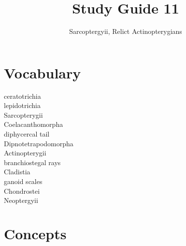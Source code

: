 \documentclass[letterpaper]{tufte-handout}
\title{Study Guide 11}
\author{Sarcoptergyii, Relict Actinopterygians}
\date{} %
\begin{document}
\maketitle	%


\section{Vocabulary}
\vspace{-1\baselineskip}
\begin{multicols}{2}
ceratotrichia \\
lepidotrichia \\
Sarcopterygii \\
Coelacanthomorpha \\
diphycercal tail \\
Dipnotetrapodomorpha \\
Actinopterygii \\
branchiostegal rays \\
Cladistia \\
ganoid scales \\
Chondrostei \\
Neoptergyii
\end{multicols}

\section{Concepts}
\end{document}
